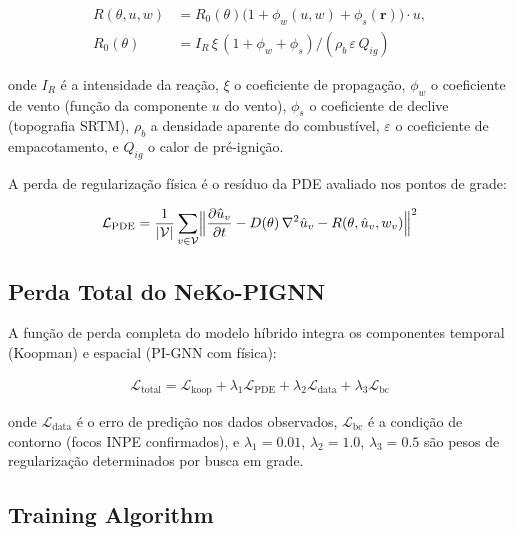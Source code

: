 \begin{align}
R(\theta, u, w) &= R_0(\theta) \bigl(1 + \phi_w(u, w) + \phi_s(\mathbf{r})\bigr) \cdot u, \\
R_0(\theta) &= I_R \, \xi \, (1 + \phi_w + \phi_s) / (\rho_b \, \varepsilon \, Q_{ig})
\label{eq:rothermel_rate}
\end{align}

onde $I_R$ é a intensidade da reação, $\xi$ o coeficiente de propagação, $\phi_w$ o coeficiente de vento (função da componente $u$ do vento), $\phi_s$ o coeficiente de declive (topografia SRTM), $\rho_b$ a densidade aparente do combustível, $\varepsilon$ o coeficiente de empacotamento, e $Q_{ig}$ o calor de pré-ignição.

A perda de regularização física é o resíduo da PDE avaliado nos pontos de grade:

\begin{equation}
\mathcal{L}_{\text{PDE}} = \frac{1}{|\mathcal{V}|} \sum_{v \in \mathcal{V}} 
\Bigl\| \frac{\partial \hat{u}_v}{\partial t} - D(\theta)\,\nabla^2 \hat{u}_v - R(\theta, \hat{u}_v, w_v) \Bigr\|^2
\label{eq:pde_loss}
\end{equation}

\subsection{Perda Total do NeKo-PIGNN}
\label{sec:total-loss}

A função de perda completa do modelo híbrido integra os componentes temporal (Koopman) e espacial (PI-GNN com física):

\begin{align}
\mathcal{L}_{\text{total}} = 
\mathcal{L}_{\text{koop}} + \lambda_1 \mathcal{L}_{\text{PDE}} + \lambda_2 \mathcal{L}_{\text{data}} + \lambda_3 \mathcal{L}_{\text{bc}}
\label{eq:total_loss}
\end{align}

onde $\mathcal{L}_{\text{data}}$ é o erro de predição nos dados observados, $\mathcal{L}_{\text{bc}}$ é a condição de contorno (focos INPE confirmados), e $\lambda_1 = 0.01$, $\lambda_2 = 1.0$, $\lambda_3 = 0.5$ são pesos de regularização determinados por busca em grade.

\subsection{Training Algorithm}
\label{sec:training-algo}

